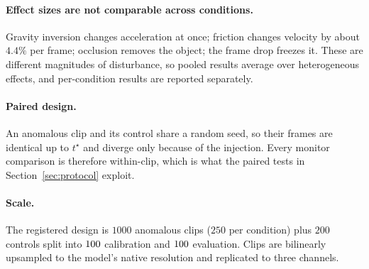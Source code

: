 \paragraph{Effect sizes are not comparable across conditions.}
Gravity inversion changes acceleration at once; friction changes velocity by
about $4.4\%$ per frame; occlusion removes the object; the frame drop freezes
it. These are different magnitudes of disturbance, so pooled results average
over heterogeneous effects, and per-condition results are reported separately.

\paragraph{Paired design.}
An anomalous clip and its control share a random seed, so their frames are
identical up to $t^\star$ and diverge only because of the injection. Every
monitor comparison is therefore within-clip, which is what the paired tests in
Section~\ref{sec:protocol} exploit.

\paragraph{Scale.}
The registered design is $1000$ anomalous clips ($250$ per condition) plus $200$
controls split into $100$ calibration and $100$ evaluation. Clips
are bilinearly upsampled to the model's native resolution and replicated to
three channels.
